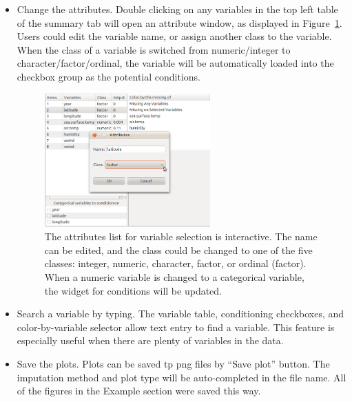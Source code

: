 \documentclass[article]{jss}
\begin{document}
\begin{itemize}
\item Change the attributes. Double clicking on any variables in the top left table of the summary tab will open an attribute window, as displayed in Figure~\ref{fig: attributes}. Users could edit the variable name, or assign another class to the variable. When the class of a variable is switched from numeric/integer to character/factor/ordinal, the variable will be automatically loaded into the checkbox group as the potential conditions.

\begin{center}
\begin{figure}[h]
\begin{centering}
\includegraphics[width=0.6\textwidth]{graph/fig8-query}
\par\end{centering}
\caption{The attributes list for variable selection is interactive. The name can be edited, and the class could be changed to one of the five classes: integer, numeric, character, factor, or ordinal (factor). When a numeric variable is changed to a categorical variable, the widget for conditions will be updated.}
\label{fig: attributes}
\end{figure}
\par\end{center}

\item Search a variable by typing. The variable table, conditioning checkboxes, and color-by-variable selector allow text entry to find a variable. This feature is especially useful when there are plenty of variables in the data.
\item Save the plots. Plots can be saved tp png files by ``Save plot'' button. The imputation method and plot type will be auto-completed in the file name. All of the figures in the Example section were saved this way.
\end{itemize}
\end{document}
